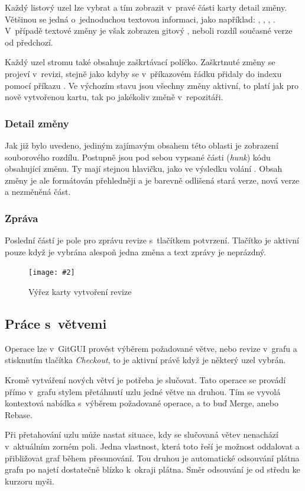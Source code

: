 \documentclass[
  biblatex,
  glossaries,
  index
]{kidiplom}
\newcommand{\pic}[4]{
\begin{figure}[h]
\centering
\texttt{[image: \#2]}
\caption{#3}
\label{fig:#4}
\end{figure}}
\begin{document}
Každý listový uzel lze vybrat a tím zobrazit v~pravé části karty detail změny. Většinou se jedná o~jednoduchou textovou informaci, jako například: , , , . V~případě textové změny je však zobrazen gitový , neboli rozdíl současné verze od předchozí.

Každý uzel stromu také obsahuje zaškrtávací políčko. Zaškrtnuté změny se projeví v~revizi, stejně jako kdyby se v~příkazovém řádku přidaly do indexu pomocí příkazu . Ve výchozím stavu jsou všechny změny aktivní, to platí jak pro nově vytvořenou kartu, tak po jakékoliv změně v~repozitáři.

\subsubsection{Detail změny}
Jak již bylo uvedeno, jediným zajímavým obsahem této oblasti je zobrazení souborového rozdílu. Postupně jsou pod sebou vypsané části ({\it hunk}) kódu obsahující změnu. Ty mají stejnou hlavičku, jako ve výsledku volání . Obsah změny je ale formátován přehledněji a je barevně odlišená stará verze, nová verze a nezměněná část.

\subsubsection{Zpráva}
Poslední částí je pole pro zprávu revize s~tlačítkem potvrzení. Tlačítko je aktivní pouze když je vybrána alespoň jedna změna a text zprávy je neprázdný.

\pic{10cm}{create-commit.png}{Výřez karty vytvoření revize}{}

\subsection{Práce s~větvemi}
Operace  lze v~GitGUI provést výběrem požadované větve, nebo revize v~grafu a stisknutím tlačítka {\it Checkout}, to je aktivní právě když je některý uzel vybrán.

Kromě vytváření nových větví je potřeba je slučovat. Tato operace se provádí přímo v~grafu stylem přetáhnutí uzlu jedné větve na druhou. Tím se vyvolá kontextová nabídka s~výběrem požadované operace, a to buď Merge, anebo Rebase.

Při přetahování uzlu může nastat situace, kdy se slučovaná větev nenachází v~aktuálním zorném poli. Jedna vlastnost, která toto řeší je možnost oddalovat a přibližovat graf během přesunování. Tou druhou je automatické odsouvání plátna grafu po najetí dostatečně blízko k~okraji plátna. Směr odsouvání je od středu ke kurzoru myši.
\end{document}
